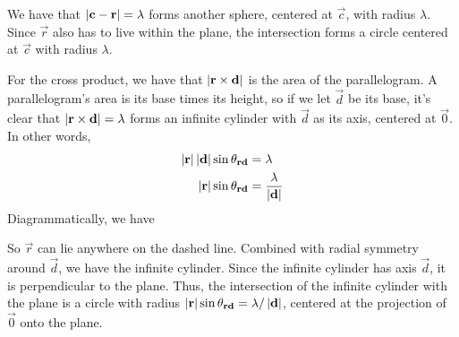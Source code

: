 \documentclass[12pt]{article}
\begin{document}
\begin{answer}
        We have that $\left\lvert \mathbf{c}-\mathbf{r} \right\rvert = \lambda$
        forms another sphere, centered at $\vec{c}$,
        with radius $\lambda$. Since $\vec{r}$ also has to
        live within the plane, the intersection
        forms a circle centered at $\vec{c}$ with radius $\lambda$.
        
        For the cross product, we have that
        $\left\lvert \mathbf{r}\times\mathbf{d} \right\rvert$ is the area of the parallelogram.
        A parallelogram's area is its base times its height,
        so if we let $\vec{d}$ be its base, it's clear that
        $\left\lvert \mathbf{r}\times\mathbf{d} \right\rvert = \lambda$ forms
        an infinite cylinder with $\vec{d}$ as its axis,
        centered at $\vec{0}$. In other words, 
        \begin{align*}
            \left\lvert \mathbf{r} \right\rvert\left\lvert \mathbf{d} \right\rvert\sin\theta_{\mathbf{r}\mathbf{d}} &= \lambda\\
            \left\lvert \mathbf{r} \right\rvert\sin\theta_{\mathbf{r}\mathbf{d}} &= \frac{\lambda}{\left\lvert \mathbf{d} \right\rvert}
        \end{align*}
        Diagrammatically, we have
        \begin{center}
        \end{center}
        So $\vec{r}$ can lie anywhere on the dashed line. Combined
        with radial symmetry around $\vec{d}$, we have the infinite cylinder.
        Since the infinite cylinder has axis $\vec{d}$, it is
        perpendicular to the plane. Thus, the intersection
        of the infinite cylinder with the plane is a circle with radius
        $\left\lvert \mathbf{r} \right\rvert\sin\theta_{\mathbf{r}\mathbf{d}} = \lambda/\left\lvert \mathbf{d} \right\rvert$,
        centered at the projection of $\vec{0}$ onto the plane.


\end{answer}
\end{document}
